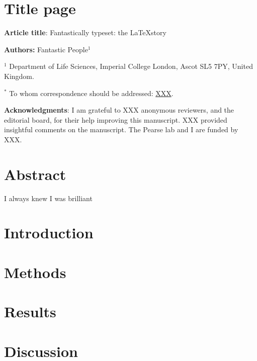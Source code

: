 \documentclass[12pt]{report}
\begin{document}
\section*{Title page}
\textbf{Article title}: Fantastically typeset: the \LaTeX story

\textbf{Authors:} Fantastic People$^1$

$^1$ Department of Life Sciences, Imperial College London, Ascot SL5 7PY, United Kingdom.

$^*$ To whom correspondence should be addressed: \url{XXX}.

\textbf{Acknowledgments}: I am grateful to XXX anonymous reviewers, and the editorial board, for their help improving this manuscript. XXX provided insightful comments on the manuscript. The Pearse lab and I are funded by XXX.

\newpage
\section{Abstract}

I always knew I was brilliant

\newpage
\section{Introduction}

\newpage
\section{Methods}

\newpage
\section{Results}

\newpage
\section{Discussion}


\clearpage
\renewcommand\bibname{References}
\printbibliography
\end{document}
